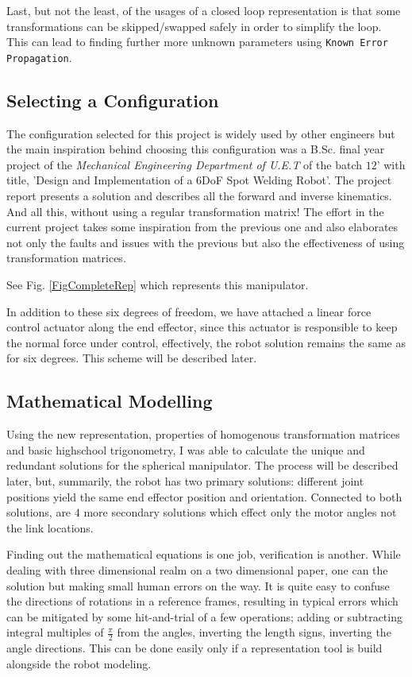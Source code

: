 {{        Last, but not the least, of the usages of a closed loop representation is that some transformations can be skipped/swapped safely in order to simplify the loop. This can lead to finding further more unknown parameters using \texttt{Known Error Propagation}.

    }
    \subsection{Selecting a Configuration}
    {
        The configuration selected for this project is widely used by other engineers but the main inspiration behind choosing this configuration was a B.Sc. final year project of the \emph{Mechanical Engineering Department of U.E.T} of the batch $12$' with title, 'Design and Implementation of a $6$DoF Spot Welding Robot'. The project report presents a solution and describes all the forward and inverse kinematics. And all this, without using a regular transformation matrix! The effort in the current project takes some inspiration from the previous one and also elaborates not only the faults and issues with the previous but also the effectiveness of using transformation matrices.

        See Fig. \ref{FigCompleteRep} which represents this manipulator.

        In addition to these six degrees of freedom, we have attached a linear force control actuator along the end effector, since this actuator is responsible to keep the normal force under control, effectively, the robot solution remains the same as for six degrees. This scheme will be described later.
    }
    \subsection{Mathematical Modelling}
    {
        Using the new representation, properties of homogenous transformation matrices and basic highschool trigonometry,  I was able to calculate the unique and redundant solutions for the spherical manipulator. The process will be described later, but, summarily, the robot has two primary solutions: different joint positions yield the same end effector position and orientation. Connected to both solutions, are $4$ more secondary solutions which effect only the motor angles not the link locations.


        Finding out the mathematical equations is one job, verification is another. While dealing with three dimensional realm on a two dimensional paper, one can the solution but making small human errors on the way. It is quite easy to confuse the directions of rotations in a reference frames, resulting in typical errors which can be mitigated by some hit-and-trial of a few operations; adding or subtracting integral multiples of $\frac{\pi}{2}$ from the angles, inverting the length signs, inverting the angle directions. This can be done easily only if a representation tool is build alongside the robot modeling.
    }
}
